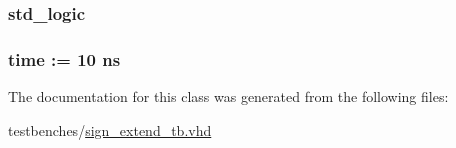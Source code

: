 \hypertarget{classsign__extend__tb_1_1behavioral_af5c312450d9816b418bbe2f10c031a4b}{
\subsubsection[{clk}]{ {\bfseries std\-\_\-logic } }}\label{classsign__extend__tb_1_1behavioral_af5c312450d9816b418bbe2f10c031a4b}
\hypertarget{classsign__extend__tb_1_1behavioral_a508d91be85dbb14f5c19987e818c5aa9}{
\subsubsection[{clk\-\_\-period}]{ {\bfseries time  \-:=  10  ns } }}\label{classsign__extend__tb_1_1behavioral_a508d91be85dbb14f5c19987e818c5aa9}


\-The documentation for this class was generated from the following files\-:\begin{DoxyCompactItemize}
\item 
testbenches/\hyperlink{sign__extend__tb_8vhd}{sign\-\_\-extend\-\_\-tb.\-vhd}\end{DoxyCompactItemize}
